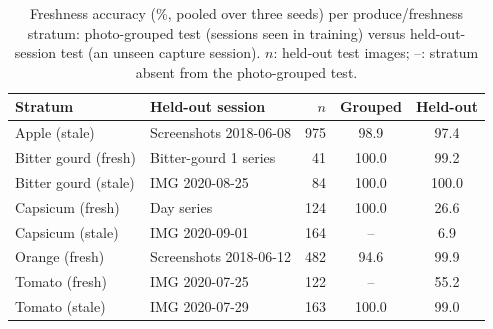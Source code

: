 \begin{table}[t]
\centering
\caption{Freshness accuracy (\%, pooled over three seeds) per produce/freshness stratum: photo-grouped test (sessions seen in training) versus held-out-session test (an unseen capture session). $n$: held-out test images; --: stratum absent from the photo-grouped test.}
\label{tab:session}
\footnotesize
\setlength{\tabcolsep}{2.5pt}
\begin{tabular}{llrcc}
\toprule
Stratum & Held-out session & $n$ & Grouped & Held-out \\
\midrule
Apple (stale) & Screenshots 2018-06-08 & 975 & 98.9 & 97.4 \\
Bitter gourd (fresh) & Bitter-gourd 1 series & 41 & 100.0 & 99.2 \\
Bitter gourd (stale) & IMG 2020-08-25 & 84 & 100.0 & 100.0 \\
Capsicum (fresh) & Day series & 124 & 100.0 & 26.6 \\
Capsicum (stale) & IMG 2020-09-01 & 164 & -- & 6.9 \\
Orange (fresh) & Screenshots 2018-06-12 & 482 & 94.6 & 99.9 \\
Tomato (fresh) & IMG 2020-07-25 & 122 & -- & 55.2 \\
Tomato (stale) & IMG 2020-07-29 & 163 & 100.0 & 99.0 \\
\bottomrule
\end{tabular}
\end{table}
